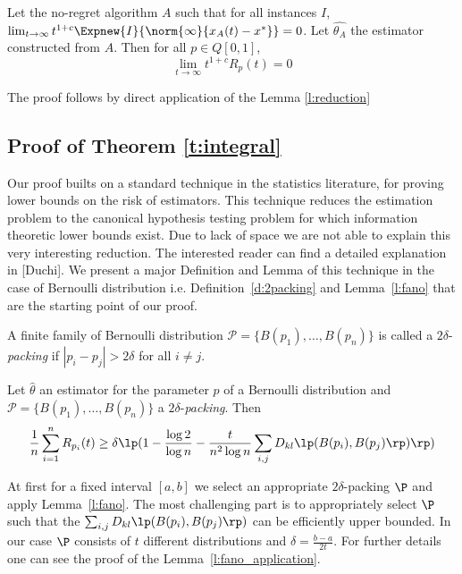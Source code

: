 \begin{theorem}
Let the no-regret algorithm $A$ such that for all instances $I$, $\lim_{t \rightarrow \infty} t^{1+c} \Expnew{I}{\norm{\infty}{x_A(t)-x^*}}=0$.
Let $\hat{\theta_A}$ the estimator constructed from $A$. Then for all  $p \in Q[0,1]$, \[\lim_{t \rightarrow \infty}t^{1+c}R_p(t)=0\]
\end{theorem}
The proof follows by direct application of the Lemma \ref{l:reduction}

\subsection{Proof of Theorem \ref{t:integral}}
Our proof builts on a standard technique in the statistics literature, for proving lower bounds on the risk of estimators. 
This technique reduces the estimation problem to the canonical hypothesis testing problem for which information 
theoretic lower bounds exist. Due to lack of space we are not able to explain this very interesting reduction. The 
interested reader can find a detailed explanation in \cite{}[Duchi]. We present a major Definition and Lemma
of this technique in the case of Bernoulli distribution i.e. Definition~\ref{d:2packing} and Lemma~\ref{l:fano} that are 
the starting point of our proof.

\begin{definition}\label{d:2packing}
A finite family of Bernoulli distribution $\mathcal{P}=\{B(p_1),\ldots,B(p_n)\}$ is called a $2\delta$-\emph{packing} if $|p_i-p_j|>2\delta$ for all $i \neq j$.
\end{definition}



\begin{lemma}\label{l:fano}
Let $\hat{\theta}$ an estimator for the parameter $p$ of a Bernoulli distribution and $\mathcal{P}=\{B(p_1),\ldots,B(p_n)\}$ a $2\delta$-\emph{packing}.
Then
\[\frac{1}{n} \sum_{i=1}^n R_{p_i}(t) \geq \delta \lp(1-\frac{\log 2}{\log n} - \frac{t}{n^2\log n}\sum_{i,j}D_{kl}\lp(B(p_i),B(p_j)\rp)\rp)\]%
\end{lemma}



\noindent At first for a fixed interval $[a,b]$ we select an appropriate $2\delta$-packing $\P$ and apply Lemma~\ref{l:fano}. 
The most challenging part is to appropriately select $\P$ such that the $\sum_{i,j}D_{kl}\lp(B(p_i),B(p_j)\rp)$ can be 
efficiently upper bounded. In our case $\P$ consists of $t$ different distributions and $\delta=\frac{b-a}{2t}$. For further details
one can see the proof of the Lemma~\ref{l:fano_application}.

